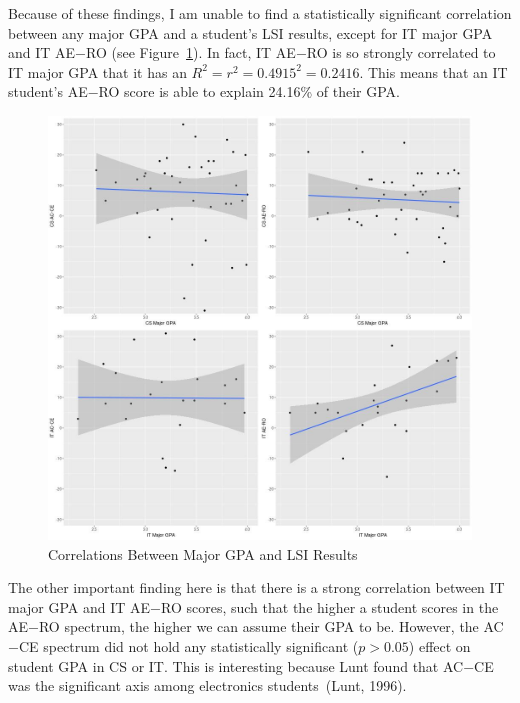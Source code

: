 Because of these findings, I am unable to find a statistically significant correlation between any major GPA and a student's LSI results, except for IT major GPA and IT AE$-$RO (see Figure~\ref{fig:major_gpa_lm_plots}). In fact, IT AE$-$RO is so strongly correlated to IT major GPA that it has an $R^2=r^2=0.4915^2=0.2416$. This means that an IT student's AE$-$RO score is able to explain 24.16\% of their GPA.

\begin{figure}
  \centering
  \includegraphics[width=1.1\textwidth]{figures/chapter4/major_gpa_lm_plots.jpg}
  \caption{Correlations Between Major GPA and LSI Results}
  \label{fig:major_gpa_lm_plots}
\end{figure}

The other important finding here is that there is a strong correlation between IT major GPA and IT AE$-$RO scores, such that the higher a student scores in the AE$-$RO spectrum, the higher we can assume their GPA to be. However, the AC$-$CE spectrum did not hold any statistically significant ($p>0.05$) effect on student GPA in CS or IT. This is interesting because Lunt found that AC$-$CE was the significant axis among electronics students~(Lunt, 1996).

